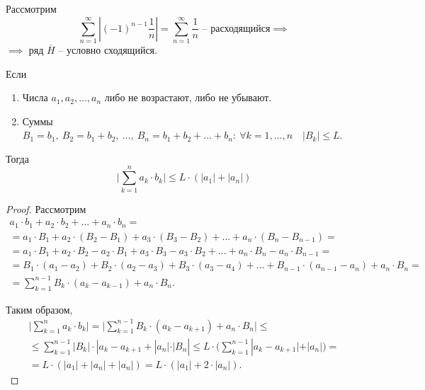 \begin{example}
    Рассмотрим
    \[
        \sum_{n=1}^{\infty}\left|(-1)^{n-1}\frac{1}{n}\right| = \sum_{n=1}^{\infty}\frac{1}{n} \text{ -- расходящийся} \implies
    \] $\implies$ ряд $\overline{H}$ -- условно сходящийся.
\end{example}

\begin{lemma}
    Если
    \begin{enumerate}
        \item Числа $a_1,a_2,\ldots,a_n$ либо не возрастают, либо не убывают.
        \item Суммы $B_1 = b_1, \ B_2 = b_1 + b_2, \ \ldots, \ B_n = b_1 + b_2 + \ldots + b_n: \ \forall k = 1,\ldots,n \quad |B_k| \leqslant L$.
    \end{enumerate}

    Тогда
    \begin{equation}\label{eq:6.6}
        \bigg|\sum_{k=1}^{n} a_k \cdot b_k \bigg| \leqslant L\cdot (|a_1| + |a_n|)
    \end{equation}
\end{lemma}

\begin{proof}
    Рассмотрим
    \begin{multline*}
        a_1 \cdot b_1 + a_2 \cdot b_2 + \ldots + a_n \cdot b_n = \\
        = a_1 \cdot B_1 + a_2 \cdot (B_2 - B_1) + a_3 \cdot (B_3 - B_2) + \ldots + a_n \cdot (B_n - B_{n-1}) = \\
        = a_1 \cdot B_1 + a_2 \cdot B_2 - a_2 \cdot B_1 + a_3\cdot B_3 - a_3 \cdot B_2 + \ldots + a_n \cdot B_n - a_n \cdot B_{n-1} = \\
        = B_1\cdot (a_1 - a_2) + B_2\cdot (a_2 - a_3) + B_3 \cdot (a_3 - a_4) + \ldots + B_{n-1} \cdot (a_{n-1} - a_n) + a_n \cdot B_n = \\
        = \sum_{k=1}^{n-1} B_k \cdot (a_k - a_{k-1}) + a_n \cdot B_n.
    \end{multline*}

    Таким образом,
    \begin{multline*}
        \bigg|\sum_{k=1}^{n}a_k\cdot b_k \bigg| = \bigg|\sum_{k=1}^{n-1} B_k \cdot (a_k - a_{k+1}) + a_n \cdot B_n\bigg| \leqslant \\
        \leqslant \sum_{k=1}^{n-1}|B_k| \cdot |a_k - a_{k+1} + |a_n| \cdot |B_n| \leqslant L\cdot \bigg(\sum_{k=1}^{n-1}|a_k - a_{k+1}| + |a_n|\bigg) = \\
        = L\cdot (|a_1| + |a_n| + |a_n|) = L\cdot (|a_1| + 2\cdot |a_n|).
    \end{multline*}
\end{proof}

